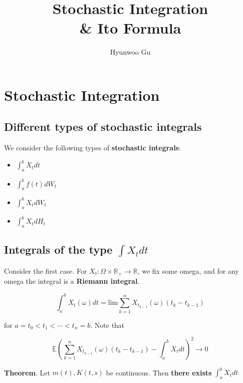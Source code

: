\documentclass[12pt]{article}
\theoremstyle{nonumberbreak}
\begin{document}
\title{\textbf{Stochastic Integration \\ \& Ito Formula}}
\author{Hyunwoo Gu}
\date{}

\maketitle


\section{Stochastic Integration}

\subsection{Different types of stochastic integrals}

We consider the following types of \textbf{stochastic integrals}: 

\begin{itemize}
	\item $\int_a^b X_t dt$
	\item $\int_a^b f(t) dW_t $
	\item $\int_a^b X_t dW_t$
	\item $\int_a^b X_t dH_t$
\end{itemize}


\subsection{Integrals of the type $\int X_t dt$}

Consider the first case. For $X_t : \Omega \times \mathbb{R}_+ \to \mathbb{R}$, we fix some omega, and for any omega the integral is a \textbf{Riemann integral}.  

$$
\int_a^b X_t(\omega) dt = \mathrm{lim} \sum_{k=1}^n X_{t_{k-1}}(\omega) ( t_k - t_{k-1})
$$

for $a = t_0 < t_1 < \cdots < t_n = b$. Note that 

$$
\mathbb{E} \left( \sum_{k=1}^n X_{t_{k-1}}(\omega) ( t_k - t_{k-1}) -\int_a^b X_t dt  \right)^2 \to 0
$$

\begin{theorem}
\textbf{Theorem}. Let $m(t), K(t,s)$ be continuous. Then \textbf{there exists} $\int_a^b X_t dt$
\end{theorem}
\end{document}
